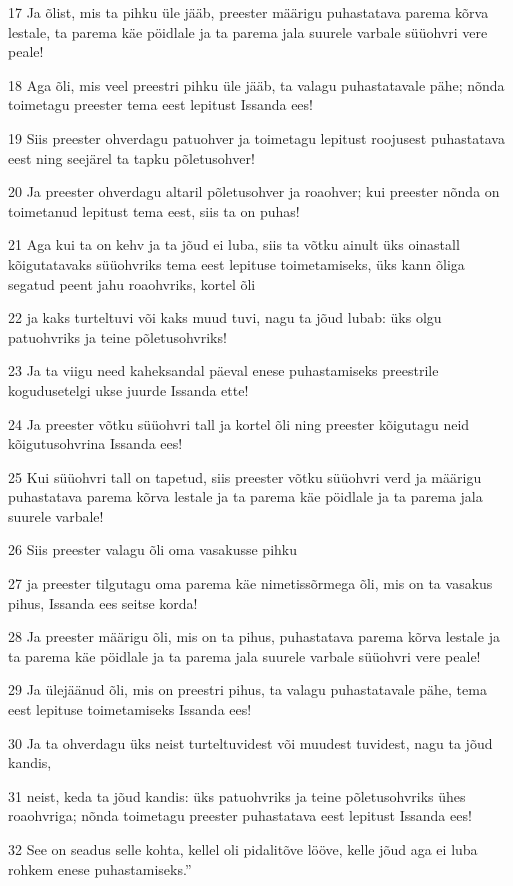 \par 17 Ja õlist, mis ta pihku üle jääb, preester määrigu puhastatava parema kõrva lestale, ta parema käe pöidlale ja ta parema jala suurele varbale süüohvri vere peale!
\par 18 Aga õli, mis veel preestri pihku üle jääb, ta valagu puhastatavale pähe; nõnda toimetagu preester tema eest lepitust Issanda ees!
\par 19 Siis preester ohverdagu patuohver ja toimetagu lepitust roojusest puhastatava eest ning seejärel ta tapku põletusohver!
\par 20 Ja preester ohverdagu altaril põletusohver ja roaohver; kui preester nõnda on toimetanud lepitust tema eest, siis ta on puhas!
\par 21 Aga kui ta on kehv ja ta jõud ei luba, siis ta võtku ainult üks oinastall kõigutatavaks süüohvriks tema eest lepituse toimetamiseks, üks kann õliga segatud peent jahu roaohvriks, kortel õli
\par 22 ja kaks turteltuvi või kaks muud tuvi, nagu ta jõud lubab: üks olgu patuohvriks ja teine põletusohvriks!
\par 23 Ja ta viigu need kaheksandal päeval enese puhastamiseks preestrile kogudusetelgi ukse juurde Issanda ette!
\par 24 Ja preester võtku süüohvri tall ja kortel õli ning preester kõigutagu neid kõigutusohvrina Issanda ees!
\par 25 Kui süüohvri tall on tapetud, siis preester võtku süüohvri verd ja määrigu puhastatava parema kõrva lestale ja ta parema käe pöidlale ja ta parema jala suurele varbale!
\par 26 Siis preester valagu õli oma vasakusse pihku
\par 27 ja preester tilgutagu oma parema käe nimetissõrmega õli, mis on ta vasakus pihus, Issanda ees seitse korda!
\par 28 Ja preester määrigu õli, mis on ta pihus, puhastatava parema kõrva lestale ja ta parema käe pöidlale ja ta parema jala suurele varbale süüohvri vere peale!
\par 29 Ja ülejäänud õli, mis on preestri pihus, ta valagu puhastatavale pähe, tema eest lepituse toimetamiseks Issanda ees!
\par 30 Ja ta ohverdagu üks neist turteltuvidest või muudest tuvidest, nagu ta jõud kandis,
\par 31 neist, keda ta jõud kandis: üks patuohvriks ja teine põletusohvriks ühes roaohvriga; nõnda toimetagu preester puhastatava eest lepitust Issanda ees!
\par 32 See on seadus selle kohta, kellel oli pidalitõve lööve, kelle jõud aga ei luba rohkem enese puhastamiseks.”
